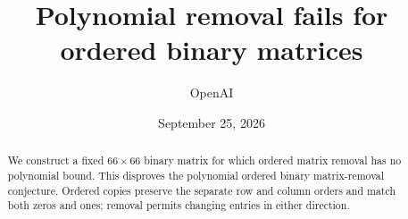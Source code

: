\documentclass[11pt]{article}
\title{Polynomial removal fails for ordered binary matrices}
\author{OpenAI}
\date{September 25, 2026}
\theoremstyle{definition}
\theoremstyle{remark}
\numberwithin{equation}{section}
\begin{document}
\maketitle
\begin{abstract}
We construct a fixed $66\times66$ binary matrix for which ordered matrix
removal has no polynomial bound. This disproves the polynomial ordered
binary matrix-removal conjecture. Ordered copies preserve the separate
row and column orders and match both zeros and ones; removal permits
changing entries in either direction.
\end{abstract}








\end{document}

